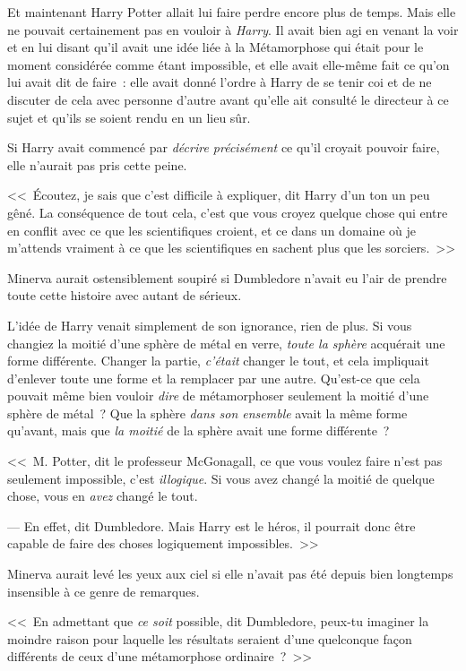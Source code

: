Et maintenant Harry Potter allait lui faire perdre encore plus de temps. Mais elle ne pouvait certainement pas en vouloir à \emph{Harry}. Il avait bien agi en venant la voir et en lui disant qu'il avait une idée liée à la Métamorphose qui était pour le moment considérée comme étant impossible, et elle avait elle-même fait ce qu'on lui avait dit de faire~: elle avait donné l'ordre à Harry de se tenir coi et de ne discuter de cela avec personne d'autre avant qu'elle ait consulté le directeur à ce sujet et qu'ils se soient rendu en un lieu sûr.

Si Harry avait commencé par \emph{décrire précisément} ce qu'il croyait pouvoir faire, elle n'aurait pas pris cette peine.

<<~Écoutez, je sais que c'est difficile à expliquer, dit Harry d'un ton un peu gêné. La conséquence de tout cela, c'est que vous croyez quelque chose qui entre en conflit avec ce que les scientifiques croient, et ce dans un domaine où je m'attends vraiment à ce que les scientifiques en sachent plus que les sorciers.~>>

Minerva aurait ostensiblement soupiré si Dumbledore n'avait eu l'air de prendre toute cette histoire avec autant de sérieux.

L'idée de Harry venait simplement de son ignorance, rien de plus. Si vous changiez la moitié d'une sphère de métal en verre, \emph{toute la sphère} acquérait une forme différente. Changer la partie, \emph{c'était} changer le tout, et cela impliquait d'enlever toute une forme et la remplacer par une autre. Qu'est-ce que cela pouvait même bien vouloir \emph{dire} de métamorphoser seulement la moitié d'une sphère de métal~? Que la sphère \emph{dans son ensemble} avait la même forme qu'avant, mais que \emph{la moitié} de la sphère avait une forme différente~?

<<~M. Potter, dit le professeur McGonagall, ce que vous voulez faire n'est pas seulement impossible, c'est \emph{illogique}. Si vous avez changé la moitié de quelque chose, vous en \emph{avez} changé le tout.

--- En effet, dit Dumbledore. Mais Harry est le héros, il pourrait donc être capable de faire des choses logiquement impossibles.~>>

Minerva aurait levé les yeux aux ciel si elle n'avait pas été depuis bien longtemps insensible à ce genre de remarques.

<<~En admettant que \emph{ce soit} possible, dit Dumbledore, peux-tu imaginer la moindre raison pour laquelle les résultats seraient d'une quelconque façon différents de ceux d'une métamorphose ordinaire~?~>>

